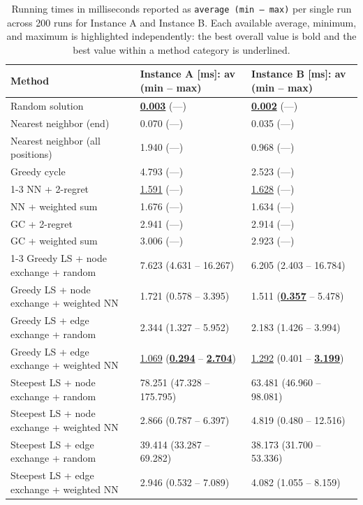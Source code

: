 \begin{table}[h!]
\centering
\footnotesize
\setlength{\tabcolsep}{3pt}
\renewcommand{\arraystretch}{1.5}
\caption{Running times in milliseconds reported as \texttt{average (min -- max)} per single run across 200 runs for Instance A and Instance B. Each available average, minimum, and maximum is highlighted independently: the best overall value is bold and the best value within a method category is underlined.}
\label{tab:time_results}
\vspace{0.5em}
\begin{tabularx}{\textwidth}{p{7.2cm} X X}
\toprule
\textbf{Method} & \textbf{Instance A [ms]: av (min -- max)} & \textbf{Instance B [ms]: av (min -- max)} \\
\midrule
Random solution & \textbf{\underline{0.003}} (---) & \textbf{\underline{0.002}} (---) \\
Nearest neighbor (end) & 0.070 (---) & 0.035 (---) \\
Nearest neighbor (all positions) & 1.940 (---) & 0.968 (---) \\
Greedy cycle & 4.793 (---) & 2.523 (---) \\
\cmidrule{1-3}
NN + 2-regret & \underline{1.591} (---) & \underline{1.628} (---) \\
NN + weighted sum & 1.676 (---) & 1.634 (---) \\
GC + 2-regret & 2.941 (---) & 2.914 (---) \\
GC + weighted sum & 3.006 (---) & 2.923 (---) \\
\cmidrule{1-3}
Greedy LS + node exchange + random & 7.623 (4.631 -- 16.267) & 6.205 (2.403 -- 16.784) \\
Greedy LS + node exchange + weighted NN & 1.721 (0.578 -- 3.395) & 1.511 (\textbf{\underline{0.357}} -- 5.478) \\
Greedy LS + edge exchange + random & 2.344 (1.327 -- 5.952) & 2.183 (1.426 -- 3.994) \\
Greedy LS + edge exchange + weighted NN & \underline{1.069} (\textbf{\underline{0.294}} -- \textbf{\underline{2.704}}) & \underline{1.292} (0.401 -- \textbf{\underline{3.199}}) \\
Steepest LS + node exchange + random & 78.251 (47.328 -- 175.795) & 63.481 (46.960 -- 98.081) \\
Steepest LS + node exchange + weighted NN & 2.866 (0.787 -- 6.397) & 4.819 (0.480 -- 12.516) \\
Steepest LS + edge exchange + random & 39.414 (33.287 -- 69.282) & 38.173 (31.700 -- 53.336) \\
Steepest LS + edge exchange + weighted NN & 2.946 (0.532 -- 7.089) & 4.082 (1.055 -- 8.159) \\
\bottomrule
\end{tabularx}
\end{table}

